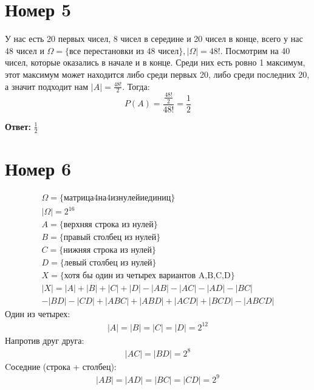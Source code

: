 \documentclass[a4paper,12pt]{article}
\begin{document}
\section*{Номер 5}
У нас есть 20 первых чисел, 8 чисел в середине и 20 чисел в конце, всего у нас 48 чисел и $\Omega = \{ \text{все перестановки из 48 чисел} \}, |\Omega| = 48!$. Посмотрим на 40 чисел, которые оказались в начале и в конце. Среди них есть ровно 1 максимум, этот максимум может находится либо среди первых 20, либо среди последних 20, а значит подходит нам $|A| = \frac{48!}{2}$. Тогда:
\[
P(A) = \frac{\frac{48!}{2}}{48!} = \frac{1}{2}
\]
\begin{center}
\textbf{Ответ: } $ \frac{1}{2} $
\end{center}
 \section*{Номер 6}
\begin{equation*}
\begin{gathered}
\Omega = \{матрица 4 на 4 из нулей и единиц\} \\
|\Omega| = 2^{16} \\
A = \{
\text{верхняя строка из нулей}
\}
\\
B = \{
\text{правый столбец из нулей}
\}
\\
C = \{
\text{нижняя строка из нулей}
\}
\\
D = \{
\text{левый столбец из нулей
}
\}
\\
X = \{\text{хотя бы один из четырех вариантов A,B,C,D}\} \\
|X| = |A| + |B| + |C| + |D| - |AB| - |AC| - |AD| - |BC| \\
- |BD| - |CD| + |ABC| + |ABD| + |ACD| + |BCD| - |ABCD| 
\end{gathered}
\end{equation*}
Один из четырех:
\begin{equation*}
\begin{gathered}
|A| = |B| = |C| = |D| = 2^{12}
\end{gathered}
\end{equation*}
Напротив друг друга:
\begin{equation*}
\begin{gathered}
|AC| = |BD| = 2^8
\end{gathered}
\end{equation*}
Cоседние (строка + столбец):
\begin{equation*}
\begin{gathered}
|AB| = |AD| = |BC| = |CD| = 2^9
\end{gathered}
\end{equation*}
\end{document}
